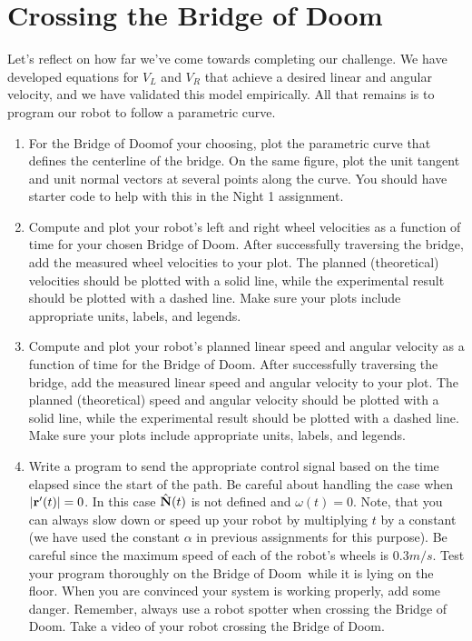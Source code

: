\documentclass{tufte-handout}
\def \BoD {Bridge of Doom\texttrademark}
\begin{document}
\section{Crossing the Bridge of Doom}
Let's reflect on how far we've come towards completing our challenge.  We have developed equations for $V_L$ and $V_R$ that achieve a desired linear and angular velocity, and we have validated this model empirically.  All that remains is to program our robot to follow a parametric curve.

\begin{enumerate}[series=Deliverable, label=\textbf{Deliverable} (\arabic*)]

\item For the \BoD of your choosing, plot the parametric curve that defines the centerline of the bridge. On the same figure, plot the unit tangent and unit normal vectors at several points along the curve. You should have starter code to help with this in the Night 1 assignment.

\item Compute and plot your robot's left and right wheel velocities as a function of time for your chosen \BoD. After successfully traversing the bridge, add the measured wheel velocities to your plot. The planned (theoretical) velocities should be plotted with a solid line, while the experimental result should be plotted with a dashed line. Make sure your plots include appropriate units, labels, and legends.

\item Compute and plot your robot's planned linear speed and angular velocity as a function of time for the \BoD. After successfully traversing the bridge, add the measured linear speed and angular velocity to your plot. The planned (theoretical) speed and angular velocity should be plotted with a solid line, while the experimental result should be plotted with a dashed line. Make sure your plots include appropriate units, labels, and legends.

\item Write a program to send the appropriate control signal based on the time elapsed since the start of the path.  Be careful about handling the case when $|\mathbf{r}'(t)| = 0$.  In this case $\hat{\mathbf{N}}(t)$ is not defined and $\omega(t) = 0$.  Note, that you can always slow down or speed up your robot by multiplying $t$ by a constant (we have used the constant $\alpha$ in previous assignments for this purpose). Be careful since the maximum speed of each of the robot's wheels is $0.3 m / s$. Test your program thoroughly on the \BoD~while it is lying on the floor.  When you are convinced your system is working properly, add some danger.  Remember, always use a robot spotter when crossing the \BoD. Take a video of your robot crossing the \BoD.


\end{enumerate}
\end{document}
